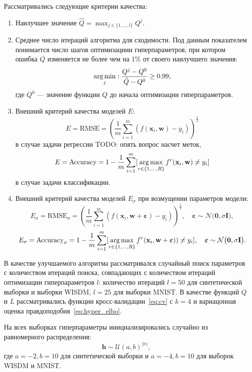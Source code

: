 Рассматривались следующие критерии качества:
\begin{enumerate}
\item Наилучшее значение $\hat{Q} = \max_{j \in \{1, \dots, l\}}Q^j$.
\item Среднее число итераций алгоритма для сходимости. Под данным показателем понимается число шагов оптимизациии гиперпараметров, при котором ошибка $Q$ изменяется не более чем на 1\% от своего наилучшего значения:
\[
    \operatorname*{arg\,min}_{j}: \frac{Q^j - Q^0}{\hat{Q} - Q^0} \geq 0.99,
\]
где $Q^0$ --- значение функции $Q$ до начала оптимизации гиперпараметров.

\item Внешний критерий качества моделей $E$:
\[
    E = \text{RMSE} = \left (\frac{1}{m}\sum_{i=1}^m (f(\mathbf{x}_i, \mathbf{w})-y_i)\right)^{\frac{1}{2}}
\]
в случае задачи регрессии TODO: опять вопрос насчет меток,
\[
    E = \text{Accuracy} = 1 - \frac{1}{m}\sum_{i=1}^m [\operatorname*{arg\,max}_{r \in \{1, \dots, R\}}f^r(\mathbf{x}_i, \mathbf{w}) \neq y_i]
\]
в случае задачи классификации.

\item Внешний критерий качества моделей $E_\sigma$ при возмущении параметров модели:
\[
    E_\sigma = \text{RMSE}_\sigma = \left (\frac{1}{m}\sum_{i=1}^m (f(\mathbf{x}_i, \mathbf{w} + \boldsymbol{\varepsilon})-y_i)\right)^{\frac{1}{2}}, \quad \boldsymbol{\varepsilon} \sim \mathcal{N}\bigl(\mathbf{0}, \sigma\mathbf{I}\bigr),
\]
\[
    E_\sigma  = \text{Accuracy}_\sigma  = 1 - \frac{1}{m}\sum_{i=1}^m [\operatorname*{arg\,max}_{r \in \{1, \dots, R\}}f^r(\mathbf{x}_i, \mathbf{w }  + \boldsymbol{\varepsilon})) \neq y_i],  \quad \boldsymbol{\varepsilon} \sim \mathcal{N}\bigl(\mathbf{0}, \sigma\mathbf{I}\bigr).
\]

\end{enumerate}

В качестве улучшаемого алгоритма рассматривался случайный поиск параметров с количеством итераций поиска, совпадающих с количеством итераций оптимизации гиперпараметров $l$: количество итераций $l=50$ для синтетической выборки и выборки WISDM, $l=25$ для выборки MNIST. В качестве функций $Q$ и $L$ рассматривались функции кросс-валидации~\eqref{eq:cv} с $k=4$ и вариацонная оценка правдоподобия~\eqref{eq:hyper_elbo}. 




На всех выборках гиперпараметры инициализировались случайно из равномерного распределения:
\[
    \mathbf{h} \sim \mathcal{U}(a,b)^{|\mathbb{H}|},
\]
где $a = -2, b = 10$ для синтетической выборки и $a = -4, b = 10$ для выборок WISDM и MNIST.

